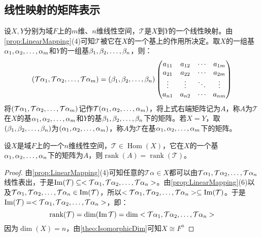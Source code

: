 \subsection{线性映射的矩阵表示}
\begin{definition}
	设$X,Y$分别为域$F$上的$m$维、$n$维线性空间，$\mathcal{T}$是$X$到$Y$的一个线性映射。由\cref{prop:LinearMapping}(4)可知$\mathcal{T}$被它在$X$的一个基上的作用所决定。取$X$的一组基$\alpha_1, \alpha_2, \dots, \alpha_{m}$和$Y$的一组基$\beta_1, \beta_2, \dots, \beta_{n}$，则：
	\begin{equation*}
		(\mathcal{T}\alpha_1, \mathcal{T}\alpha_2, \dots, \mathcal{T}\alpha_{m})=(\beta_1, \beta_2, \dots, \beta_{n})
		\begin{pmatrix}
			a_{11} & a_{12} & \cdots & a_{1m} \\
			a_{21} & a_{22} & \cdots & a_{2m} \\
			\vdots & \vdots & \ddots & \vdots \\
			a_{n1} & a_{n2} & \cdots & a_{nm} \\
		\end{pmatrix}
	\end{equation*}
	将$(\mathcal{T}\alpha_1, \mathcal{T}\alpha_2, \dots, \mathcal{T}\alpha_{m})$记作$\mathcal{T}(\alpha_1, \alpha_2, \dots, \alpha_{m})$，将上式右端矩阵记为$A$，称$A$为$\mathcal{T}$在$X$的基$\alpha_1, \alpha_2, \dots, \alpha_{m}$和$Y$的基$\beta_1, \beta_2, \dots, \beta_{n}$下的矩阵。若$X=Y$，取$(\beta_1, \beta_2, \dots, \beta_{n})$为$(\alpha_1, \alpha_2, \dots, \alpha_{m})$，称$A$为$\mathcal{T}$在基$\alpha_1, \alpha_2, \dots, \alpha_{m}$下的矩阵。
\end{definition}
\begin{theorem}
	设$X$是域$F$上的一个$n$维线性空间，$\mathcal{T}\in\operatorname{Hom}(X)$，它在$X$的一个基$\alpha_1, \alpha_2, \dots, \alpha_{n}$下的矩阵为$A$，则$\operatorname{rank}(A)=\operatorname{rank}(\mathcal{T})$。
\end{theorem}
\begin{proof}
	由\cref{prop:LinearMapping}(4)可知任意的$\mathcal{T}\alpha\in X$都可以由$\mathcal{T}\alpha_1, \mathcal{T}\alpha_2, \dots, \mathcal{T}\alpha_{n}$线性表出，于是$\operatorname{Im}(\mathcal{T})\subseteq<\mathcal{T}\alpha_1, \mathcal{T}\alpha_2, \dots, \mathcal{T}\alpha_{n}>$。由\cref{prop:LinearMapping}(6)以及$\mathcal{T}\alpha_1, \mathcal{T}\alpha_2, \dots, \mathcal{T}\alpha_{n}\in\operatorname{Im}(\mathcal{T})$，所以$<\mathcal{T}\alpha_1, \mathcal{T}\alpha_2, \dots, \mathcal{T}\alpha_{n}>\subseteq\operatorname{Im}(\mathcal{T})$。于是$\operatorname{Im}(\mathcal{T})=<\mathcal{T}\alpha_1, \mathcal{T}\alpha_2, \dots, \mathcal{T}\alpha_{n}>$，即：
	\begin{equation*}
		\operatorname{rank}(\mathcal{T})=\dim(\operatorname{Im}\mathcal{T})=\dim<\mathcal{T}\alpha_1, \mathcal{T}\alpha_2, \dots, \mathcal{T}\alpha_{n}>
	\end{equation*}
	因为$\dim(X)=n$，由\cref{theo:IsomorphicDim}可知$X\cong F^n$
\end{proof}


